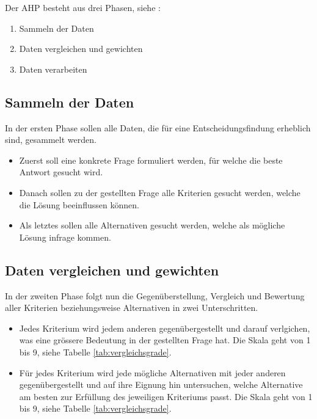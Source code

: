   Der \ac{AHP} besteht aus drei Phasen, siehe \cite{AnalyticHierarchyProcess}: 
  
  \begin{enumerate}
    \item Sammeln der Daten
    \item Daten vergleichen und gewichten
    \item Daten verarbeiten
  \end{enumerate}
  
  \subsection{Sammeln der Daten}
  
  In der ersten Phase sollen alle Daten, die für eine Entscheidungsfindung
  erheblich sind, gesammelt werden.
  
  \begin{itemize}
    \item Zuerst soll eine konkrete Frage formuliert werden, für welche die
    beste Antwort gesucht wird.
    \item Danach sollen zu der gestellten Frage alle Kriterien  gesucht werden,
    welche die Lösung beeinflussen können.
    \item Als letztes sollen alle Alternativen gesucht werden, welche als
    mögliche Lösung infrage kommen.
  \end{itemize}
  
  \subsection{Daten vergleichen und gewichten}
  
  In der zweiten Phase folgt nun die Gegenüberstellung, Vergleich und Bewertung
  aller Kriterien beziehungsweise Alternativen in zwei Unterschritten.
  
  \begin{itemize}
    \item Jedes Kriterium wird jedem anderen gegenübergestellt und darauf
    verlgichen, was eine grössere Bedeutung in der gestellten Frage hat. Die
    Skala geht von 1 bis 9, siehe Tabelle \ref{tab:vergleichsgrade}.
    \item Für jedes Kriterium wird jede mögliche Alternativen mit jeder anderen
    gegenübergestellt und auf ihre Eignung hin untersuchen, welche Alternative
    am besten zur Erfüllung des jeweiligen Kriteriums passt. Die Skala geht von
    1 bis 9, siehe Tabelle \ref{tab:vergleichsgrade}.
  \end{itemize}
  
